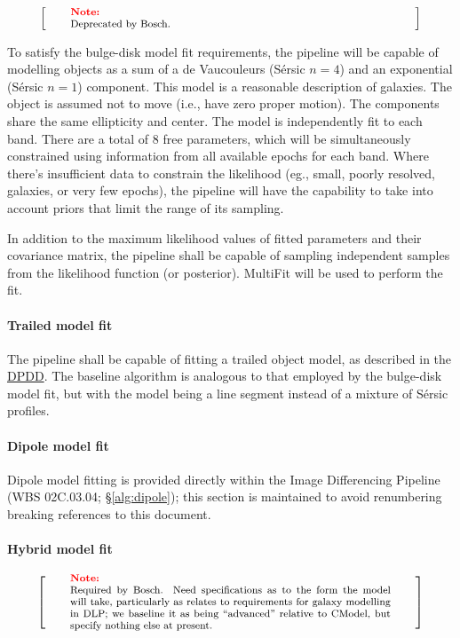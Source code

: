 \documentclass[12pt]{article}
\newcommand{\ds}[2]{{\color{blue} \href{https://docushare.lsstcorp.org/docushare/dsweb/Get/#1}{#2}}\xspace}
\newcommand{\DPDD}{\ds{LSE-163}{DPDD}}
\newcommand{\wbsDiffim}{WBS 02C.03.04}
\newenvironment{note}[1][Note]
{
  \begin{displaymath}
    \left[ \qquad
    \begin{minipage}[h]{.75\linewidth}
      \color{red} \footnotesize
      \textbf{#1:} \newline
      \color{black}
}
{
    \end{minipage}
    \normalsize
    \qquad \right]
  \end{displaymath}
}
\begin{document}
\begin{note}
Deprecated by Bosch.
\end{note}

To satisfy the bulge-disk model fit requirements, the pipeline will be capable of modelling objects as a sum of a de Vaucouleurs (S\'ersic $n=4$) and an exponential (S\'ersic $n=1$) component. This model is a reasonable description of galaxies. The object is assumed not to move (i.e., have zero proper motion). The components share the same ellipticity and center. The model is independently fit to each band. There are a total of 8 free parameters, which will be simultaneously constrained using information from all available epochs for each band. Where there's insufficient data to constrain the likelihood (eg., small, poorly resolved, galaxies, or very few epochs), the pipeline will have the capability to take into account priors that limit the range of its sampling.

In addition to the maximum likelihood values of fitted parameters and their covariance matrix, the pipeline shall be capable of sampling independent samples from the likelihood function (or posterior). MultiFit will be used to perform the fit.

\paragraph{Trailed model fit}

The pipeline shall be capable of fitting a trailed object model, as described in the \DPDD{}. The baseline algorithm is analogous to that employed by the bulge-disk model fit, but with the model being a line segment instead of a mixture of S\'ersic profiles.

\paragraph{Dipole model fit}

Dipole model fitting is provided directly within the Image Differencing Pipeline (\wbsDiffim{}; \S\ref{alg:dipole}); this section is maintained to avoid renumbering breaking references to this document.

\paragraph{Hybrid model fit}

\begin{note}
Required by Bosch. Need specifications as to the form the model will take, particularly as relates to requirements for galaxy modelling in DLP; we baseline it as being ``advanced'' relative to CModel, but specify nothing else at present.
\end{note}
\end{document}

